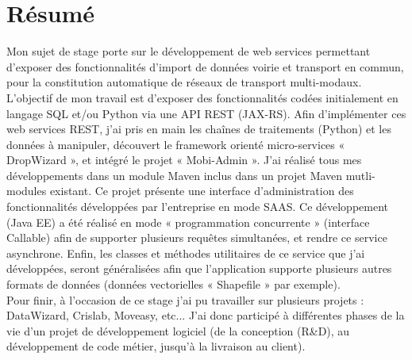 \chapter*{Résumé}\label{Resume}

Mon sujet de stage porte sur le développement de web services permettant d’exposer des fonctionnalités d’import de données voirie et transport en commun, pour la constitution automatique de réseaux de transport multi-modaux. \\

L'objectif de mon travail est d'exposer des fonctionnalités codées initialement en langage SQL et/ou Python via une API REST (JAX-RS). Afin d'implémenter ces web services REST, j'ai pris en main les chaînes de traitements (Python) et les données à manipuler, découvert le framework orienté micro-services « DropWizard », et intégré le projet « Mobi-Admin ». J'ai réalisé tous mes développements dans un module Maven inclus dans un projet Maven mutli-modules existant. Ce projet présente une interface d'administration des fonctionnalités développées par l'entreprise en mode SAAS. Ce développement (Java EE) a été réalisé en mode « programmation concurrente » (interface Callable) afin de supporter plusieurs requêtes simultanées, et rendre ce service asynchrone. Enfin, les classes et méthodes utilitaires de ce service que j'ai développées, seront généralisées afin que l'application supporte plusieurs autres formats de données (données vectorielles « Shapefile » par exemple).\\

Pour finir, à l'occasion de ce stage j'ai pu travailler sur plusieurs projets : DataWizard, Crislab, Moveasy, etc... J'ai donc participé à différentes phases de la vie d'un projet de développement logiciel (de la conception (R\&D), au développement de code métier, jusqu'à la livraison au client).\\
